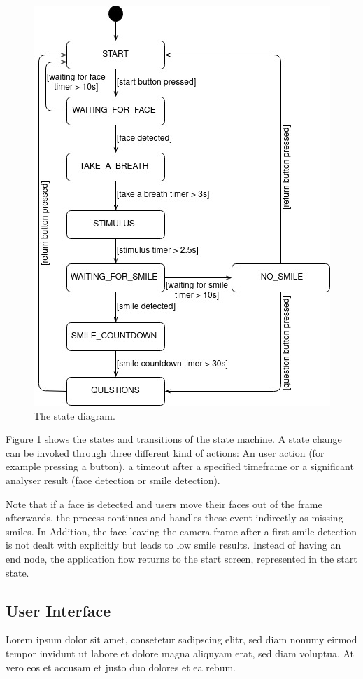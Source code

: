 \begin{figure}
  \includegraphics[width=\linewidth]{figures/state_diagramm.jpg}
  \caption{The state diagram.}
  \label{fig:state_diagramm}
\end{figure}


Figure \ref{fig:state_diagramm} shows the states and transitions of the state machine.
A state change can be invoked through three different kind of actions: An user action (for example pressing a button), a timeout after a specified timeframe or a significant analyser result (face detection or smile detection).

Note that if a face is detected and users move their faces out of the frame afterwards, the process continues and handles these event indirectly as missing smiles.
In Addition, the face leaving the camera frame after a first smile detection is not dealt with explicitly but leads to low smile results.
Instead of having an end node, the application flow returns to the start screen, represented in the start state.

\subsection{User Interface}
Lorem ipsum dolor sit amet, consetetur sadipscing elitr, sed diam nonumy eirmod tempor invidunt ut labore et dolore magna aliquyam erat, sed diam voluptua. At vero eos et accusam et justo duo dolores et ea rebum. 

